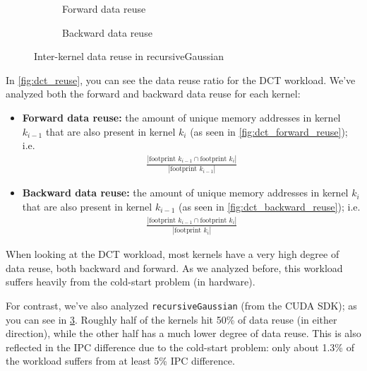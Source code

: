 \begin{figure}[ht]
    \centering
    \begin{subfigure}{0.4\textwidth}
        \resizebox{\textwidth}{!}{}
        \caption{Forward data reuse}
        \label{fig:recg_forward_reuse}
    \end{subfigure}
    \begin{subfigure}{0.4\textwidth}
        \resizebox{\textwidth}{!}{}
        \caption{Backward data reuse}
        \label{fig:recg_backward_reuse}
    \end{subfigure}
    \caption{Inter-kernel data reuse in recursiveGaussian}
    \label{fig:recg_reuse}
\end{figure}

In \cref{fig:dct_reuse}, you can see the data reuse ratio for the DCT workload.
We've analyzed both the forward and backward data reuse for each kernel:
\begin{itemize}
    \item \textbf{Forward data reuse:} the amount of unique memory addresses in kernel $k_{i-1}$ that are also present in kernel $k_{i}$ (as seen in \cref{fig:dct_forward_reuse}); i.e.
    \begin{align}
        \frac{|\text{footprint } k_{i-1} \cap \text{footprint } k_i|}{|\text{footprint } k_{i-1}|}
    \end{align}
    \item \textbf{Backward data reuse:} the amount of unique memory addresses in kernel $k_{i}$ that are also present in kernel $k_{i-1}$ (as seen in \cref{fig:dct_backward_reuse}); i.e.
    \begin{align}
        \frac{|\text{footprint } k_{i-1} \cap \text{footprint } k_i|}{|\text{footprint } k_i|}
    \end{align}
\end{itemize}

When looking at the DCT workload, most kernels have a very high degree of data reuse, both backward and forward.
As we analyzed before, this workload suffers heavily from the cold-start problem (in hardware).

For contrast, we've also analyzed \verb|recursiveGaussian| (from the CUDA SDK); as you can see in \cref{fig:recg_reuse}.
Roughly half of the kernels hit 50\% of data reuse (in either direction), while the other half has a much lower degree of data reuse.
This is also reflected in the IPC difference due to the cold-start problem: only about 1.3\% of the workload suffers from at least 5\% IPC difference.

